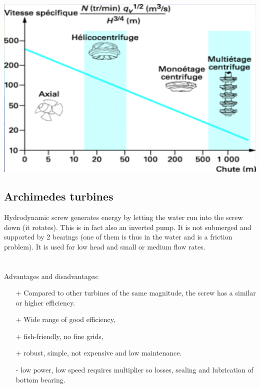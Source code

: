 \begin{center}
\includegraphics[scale=0.3]{ch4/10}
\end{center}

\subsection{Archimedes turbines}
Hydrodynamic screw generates energy by letting the water run into the screw down (it rotates). This is in fact also an inverted pump. It is not submerged and supported by 2 bearings (one of them is thus in the water and is a friction problem). It is used for low head and small or medium flow rates. \ \\\\\\

Advantages and disadvantages:  
\begin{itemize}
\item[+] Compared to other turbines of the same magnitude, the screw has a similar or higher efficiency. 
\item[+] Wide range of good efficiency,
\item[+] fish-friendly, no fine grids, 
\item[+] robust, simple, not expensive and low maintenance.
\item[-] low power, low speed requires multiplier so losses, sealing and lubrication of bottom bearing. 
\end{itemize}


